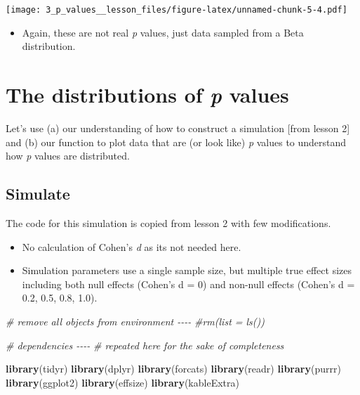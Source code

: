 \documentclass[
]{article}
\newenvironment{Shaded}{\begin{snugshade}}{\end{snugshade}}
\newcommand{\CommentTok}[1]{\textcolor[rgb]{0.56,0.35,0.01}{\textit{#1}}}
\newcommand{\FunctionTok}[1]{\textcolor[rgb]{0.13,0.29,0.53}{\textbf{#1}}}
\newcommand{\NormalTok}[1]{#1}
\providecommand{\tightlist}{%
  \setlength{\itemsep}{0pt}\setlength{\parskip}{0pt}}
\begin{document}
\texttt{[image: 3\_p\_values\_\_lesson\_files/figure-latex/unnamed-chunk-5-4.pdf]}

\begin{itemize}
\tightlist
\item
  Again, these are not real \emph{p} values, just data sampled from a
  Beta distribution.
\end{itemize}

\hypertarget{the-distributions-of-p-values}{%
\section{\texorpdfstring{The distributions of \emph{p}
values}{The distributions of p values}}\label{the-distributions-of-p-values}}

Let's use (a) our understanding of how to construct a simulation {[}from
lesson 2{]} and (b) our function to plot data that are (or look like)
\emph{p} values to understand how \emph{p} values are distributed.

\hypertarget{simulate}{%
\subsection{Simulate}\label{simulate}}

The code for this simulation is copied from lesson 2 with few
modifications.

\begin{itemize}
\tightlist
\item
  No calculation of Cohen's \emph{d} as its not needed here.
\item
  Simulation parameters use a single sample size, but multiple true
  effect sizes including both null effects (Cohen's d = 0) and non-null
  effects (Cohen's d = 0.2, 0.5, 0.8, 1.0).
\end{itemize}

\begin{Shaded}
\begin{Highlighting}[]
\CommentTok{\# remove all objects from environment {-}{-}{-}{-}}
\CommentTok{\#rm(list = ls())}


\CommentTok{\# dependencies {-}{-}{-}{-}}
\CommentTok{\# repeated here for the sake of completeness }

\FunctionTok{library}\NormalTok{(tidyr)}
\FunctionTok{library}\NormalTok{(dplyr)}
\FunctionTok{library}\NormalTok{(forcats)}
\FunctionTok{library}\NormalTok{(readr)}
\FunctionTok{library}\NormalTok{(purrr) }
\FunctionTok{library}\NormalTok{(ggplot2)}
\FunctionTok{library}\NormalTok{(effsize)}
\FunctionTok{library}\NormalTok{(kableExtra)}
\end{Highlighting}
\end{Shaded}
\end{document}
